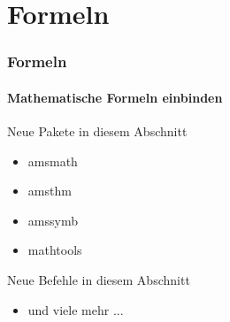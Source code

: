 \section{Formeln}
\begin{frame}
\frametitle{Formeln}
\framesubtitle{Mathematische Formeln einbinden}

\begin{exampleblock}{Neue Pakete in diesem Abschnitt}
\begin{multicols}{2}
\begin{itemize}
\item amsmath 
\item amsthm
\item amssymb
\item mathtools
\end{itemize}
\end{multicols}
\end{exampleblock}

\begin{block}{Neue Befehle in diesem Abschnitt}
\begin{multicols}{2}
\begin{itemize}
\item und viele mehr ...
\end{itemize}
\end{multicols}
\end{block}

\end{frame}

